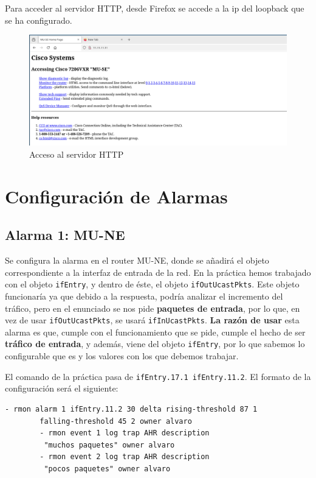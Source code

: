\documentclass[11pt]{article}
\begin{document}
Para acceder al servidor HTTP, desde Firefox se accede a la ip del loopback que se ha configurado.

\begin{figure}[h]
    \centering
    \includegraphics[width=\textwidth]{src/http.png}
    \caption{Acceso al servidor HTTP}
\end{figure}


\section{Configuración de Alarmas}

\subsection{Alarma 1: MU-NE}

Se configura la alarma en el router MU-NE, donde se añadirá el objeto correspondiente a la interfaz de entrada de la red. En la práctica hemos trabajado con el objeto \texttt{ifEntry}, y dentro de éste, el objeto \texttt{ifOutUcastPkts}. Este objeto funcionaría ya que debido a la respuesta, podría analizar el incremento del tráfico, pero en el enunciado se nos pide \textbf{paquetes de entrada}, por lo que, en vez de usar \texttt{ifOutUcastPkts}, se usará \texttt{ifInUcastPkts}. \textbf{La razón de usar} esta alarma es que, cumple con el funcionamiento que se pide, cumple el hecho de ser \textbf{tráfico de entrada}, y además, viene del objeto \texttt{ifEntry}, por lo que sabemos lo configurable que es y los valores con los que debemos trabajar.

El comando de la práctica pasa de \texttt{ifEntry.17.1  ifEntry.11.2}. El formato de la configuración será el siguiente:

\begin{tcolorbox}[
    boxrule=0pt,
    title=Configuración RMON Alarma 1 en MU-NE,
]
    \begin{lstlisting}[gobble=6]
        - rmon alarm 1 ifEntry.11.2 30 delta rising-threshold 87 1
        falling-threshold 45 2 owner alvaro
        - rmon event 1 log trap AHR description
         "muchos paquetes" owner alvaro
        - rmon event 2 log trap AHR description
         "pocos paquetes" owner alvaro
    \end{lstlisting}
\end{tcolorbox}
\end{document}
